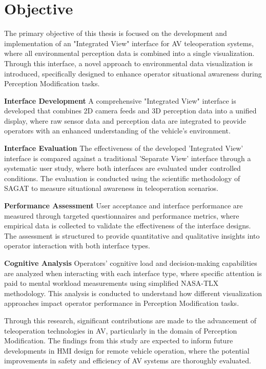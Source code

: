 \section{Objective}
The primary objective of this thesis is focused on the development and implementation of an "Integrated View" interface for \ac{AV} teleoperation systems, where all environmental perception data is combined into a single visualization. Through this interface, a novel approach to environmental data visualization is introduced, specifically designed to enhance operator situational awareness during Perception Modification tasks.

\textbf{Interface Development} A comprehensive "Integrated View" interface is developed that combines 2D camera feeds and 3D perception data into a unified display, where raw sensor data and perception data are integrated to provide operators with an enhanced understanding of the vehicle's environment.

\textbf{Interface Evaluation} The effectiveness of the developed 'Integrated View' interface is compared against a traditional 'Separate View' interface through a systematic user study, where both interfaces are evaluated under controlled conditions. The evaluation is conducted using the scientific methodology of \ac{SAGAT} to measure situational awareness in teleoperation scenarios.

\textbf{Performance Assessment} User acceptance and interface performance are measured through targeted questionnaires and performance metrics, where empirical data is collected to validate the effectiveness of the interface designs. The assessment is structured to provide quantitative and qualitative insights into operator interaction with both interface types.

\textbf{Cognitive Analysis} Operators' cognitive load and decision-making capabilities are analyzed when interacting with each interface type, where specific attention is paid to mental workload measurements using simplified NASA-TLX methodology. This analysis is conducted to understand how different visualization approaches impact operator performance in Perception Modification tasks.

Through this research, significant contributions are made to the advancement of teleoperation technologies in \ac{AV}, particularly in the domain of Perception Modification. The findings from this study are expected to inform future developments in \ac{HMI} design for remote vehicle operation, where the potential improvements in safety and efficiency of \ac{AV} systems are thoroughly evaluated.

